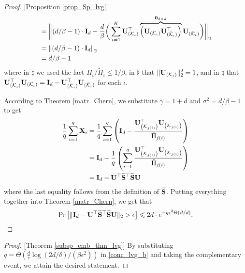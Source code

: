 \documentclass[journal,letterpaper,onecolumn,twoside,nofonttune]{IEEEtran}
\newcommand{\K}{\mathcal{K}}
\newcommand{\Kbar}{\bar{\mathcal{K}}}
\newcommand{\Ub}{\bold{U}}
\newcommand{\Ab}{\bold{A}}
\newcommand{\Ib}{\bold{I}}
\newcommand{\Sb}{\bold{S}}
\newcommand{\Sbwt}{\widetilde{\Sb}}
\newcommand{\Xb}{\bold{X}}
\newcommand{\Pit}{\tilde{\Pi}}
\begin{document}
\begin{proof}{[Proposition \ref{prop_Sp_lvg}]}
\begin{align}
  &= \bigg\|(d/\beta-1)\cdot\Ib_d-\frac{d}{\beta}\bigg(\sum_{\iota=1}^K\Ub_{(\K_\iota)}^\top\overbrace{\left(\Ub_{(\K_\iota)}\Ub_{(\Kbar_\iota)}^\top\right)}^{\bold{0}_{d\times d}}\Ub_{(\Kbar_\iota)}\bigg)\bigg\|_2 \notag\\
  &= \left\|(d/\beta-1)\cdot\Ib_d\right\|_2 \notag\\
  &= d/\beta-1 \notag
\end{align}
where in $\sharp$ we used the fact $\Pi_\iota/\Pit_\iota\leqslant1/\beta$, in $\flat$ that $\|\Ub_{(\K_\iota)}\|_2^2=1$, and in $\natural$ that $\Ub_{(\K_\iota)}^\top\Ub_{(\K_\iota)}=\Ib_d-\Ub_{(\Kbar_\iota)}^\top\Ub_{(\Kbar_\iota)}$ for each $\iota$.

According to Theorem \ref{matr_Chern}, we substitute $\gamma=1+d$ and $\sigma^2=d/\beta-1$ to get
\begin{align*}
  \frac{1}{q}\sum\limits_{i=1}^{q}\Xb_i &= \frac{1}{q}\sum\limits_{i=1}^{q}\left(\Ib_d-\frac{\Ub_{\left(\K_{j(i)}\right)}^\top\Ub_{\left(\K_{j(i)}\right)}}{\Pit_{j(i)}}\right)\\
  &= \Ib_d-\frac{1}{q}\left(\sum\limits_{i=1}^{q}\frac{\Ub_{\left(\K_{j(i)}\right)}^\top\Ub_{\left(\K_{j(i)}\right)}}{\Pit_{j(i)}}\right)\\
  &= \Ib_d-\Ub^\top\Sbwt^\top\Sbwt\Ub
\end{align*}
where the last equality follows from the definition of $\Sbwt$. Putting everything together into Theorem \ref{matr_Chern}, we get that
$$ \Pr\big[\|\Ib_d-\Ub^\top\Sbwt^\top\Sbwt\Ub\|_2>\epsilon\big]\leqslant2d\cdot e^{-q\epsilon^2\Theta(\beta/d)}. $$
\end{proof}

\begin{proof}{[Theorem \ref{subsp_emb_thm_lvg}]}
By substituting $q=\Theta\left(\frac{d}{\tau}\log{(2d/\delta)}/(\beta\epsilon^2)\right)$ in \eqref{conc_lvg_b} and taking the complementary event, we attain the desired statement.
\end{proof}
\end{document}
